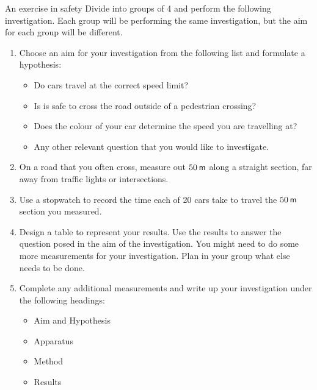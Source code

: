 \begin{Investigation}{An exercise in safety }
            \nopagebreak
        \label{m38791*id67213}Divide into groups of 4 and perform the following investigation. Each group will be performing the same investigation, but the aim for each group will be different.\par 
        \label{m38791*id67220}\begin{enumerate}[noitemsep, label=\textbf{\arabic*}. ] 
            \label{m38791*uid57}\item Choose an aim for your investigation from the following list and formulate a hypothesis:
\label{m38791*id67236}\begin{itemize}[noitemsep]
            \label{m38791*uid58}\item Do cars travel at the correct speed limit?
\label{m38791*uid59}\item Is is safe to cross the road outside of a pedestrian crossing?
\label{m38791*uid60}\item Does the colour of your car determine the speed you are travelling at?
\label{m38791*uid61}\item Any other relevant question that you would like to investigate.
\end{itemize}
        \label{m38791*uid62}\item On a road that you often cross, measure out $50\phantom{\rule{2pt}{0ex}}\mathsf{m}$ along a straight section, far away from traffic lights or intersections.
\label{m38791*uid63}\item Use a stopwatch to record the time each of 20 cars take to travel the $50\phantom{\rule{2pt}{0ex}}\mathsf{m}$ section you measured.
\label{m38791*uid64}\item Design a table to represent your results. Use the results to answer the question posed in the aim of the investigation. You might need to do some more measurements for your investigation. Plan in your group what else needs to be done.
\label{m38791*uid65}\item Complete any additional measurements and write up your investigation under the following headings:
\label{m38791*id67343}\begin{itemize}[noitemsep]
            \label{m38791*uid66}\item Aim and Hypothesis
\label{m38791*uid67}\item Apparatus
\label{m38791*uid68}\item Method
\label{m38791*uid69}\item Results

\end{itemize}
\end{enumerate}
\end{Investigation}
